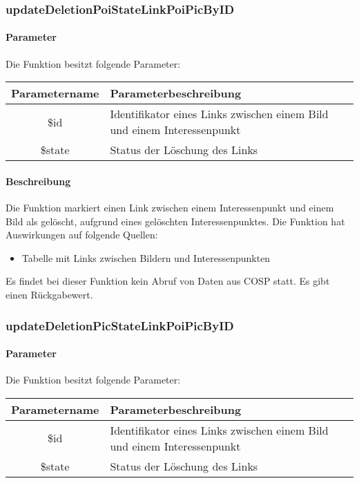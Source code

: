 \subsubsection{updateDeletionPoiStateLinkPoiPicByID}
\paragraph{Parameter} Die Funktion besitzt folgende Parameter:
\begin{table}[H]
	\begin{tabular}{|c|p{11cm}|}
		\hline
		\textbf{Parametername} & \textbf{Parameterbeschreibung} \\ \hline
		\$id    & Identifikator eines Links zwischen einem Bild und einem Interessenpunkt \\ \hline
		\$state & Status der Löschung des Links \\ \hline
	\end{tabular}
\end{table}
\paragraph{Beschreibung} Die Funktion markiert einen Link zwischen einem Interessenpunkt und einem Bild als gelöscht, aufgrund eines gelöschten Interessenpunktes. Die Funktion hat Auswirkungen auf folgende Quellen:
\begin{itemize}
	\item Tabelle mit Links zwischen Bildern und Interessenpunkten
\end{itemize}
Es findet bei dieser Funktion kein Abruf von Daten aus {\glqq COSP\grqq} statt. Es gibt einen Rückgabewert.
\subsubsection{updateDeletionPicStateLinkPoiPicByID}
\paragraph{Parameter} Die Funktion besitzt folgende Parameter:
\begin{table}[H]
	\begin{tabular}{|c|p{11cm}|}
		\hline
		\textbf{Parametername} & \textbf{Parameterbeschreibung} \\ \hline
		\$id    & Identifikator eines Links zwischen einem Bild und einem Interessenpunkt \\ \hline
		\$state & Status der Löschung des Links \\ \hline
	\end{tabular}
\end{table}
